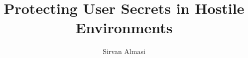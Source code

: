\documentclass[a4paper,12pt,twoside]{report}
\begin{document}

\title{
    \huge Protecting User Secrets in Hostile Environments
}
%
\author{{\rm Sirvan Almasi}}
%
\maketitle
\raggedbottom
\preface




\body








\printbibliography
\end{document}
